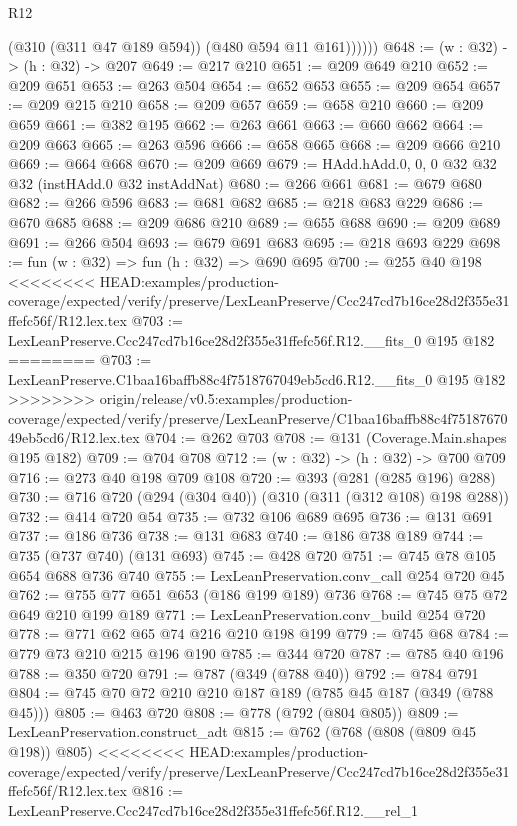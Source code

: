 \begin{lexlean}{R12}
\begin{coremodule}
{{{{{{{{              (@310 (@311 @47 @189 @594))
              (@480 @594 @11 @161))))))
@648 := (w : @32) -> (h : @32) -> @207
@649 := @217 @210
@651 := @209 @649 @210
@652 := @209 @651
@653 := @263 @504
@654 := @652 @653
@655 := @209 @654
@657 := @209 @215 @210
@658 := @209 @657
@659 := @658 @210
@660 := @209 @659
@661 := @382 @195
@662 := @263 @661
@663 := @660 @662
@664 := @209 @663
@665 := @263 @596
@666 := @658 @665
@668 := @209 @666 @210
@669 := @664 @668
@670 := @209 @669
@679 := HAdd.hAdd.{0, 0, 0} @32 @32 @32 (instHAdd.{0} @32 instAddNat)
@680 := @266 @661
@681 := @679 @680
@682 := @266 @596
@683 := @681 @682
@685 := @218 @683 @229
@686 := @670 @685
@688 := @209 @686 @210
@689 := @655 @688
@690 := @209 @689
@691 := @266 @504
@693 := @679 @691 @683
@695 := @218 @693 @229
@698 := fun (w : @32) => fun (h : @32) => @690 @695
@700 := @255 @40 @198
<<<<<<<< HEAD:examples/production-coverage/expected/verify/preserve/LexLeanPreserve/Ccc247cd7b16ce28d2f355e31ffefc56f/R12.lex.tex
@703 := LexLeanPreserve.Ccc247cd7b16ce28d2f355e31ffefc56f.R12.__fits_0 @195 @182
========
@703 := LexLeanPreserve.C1baa16baffb88c4f7518767049eb5cd6.R12.__fits_0 @195 @182
>>>>>>>> origin/release/v0.5:examples/production-coverage/expected/verify/preserve/LexLeanPreserve/C1baa16baffb88c4f7518767049eb5cd6/R12.lex.tex
@704 := @262 @703
@708 := @131 (Coverage.Main.shapes @195 @182)
@709 := @704 @708
@712 := (w : @32) -> (h : @32) -> @700 @709
@716 := @273 @40 @198 @709 @108
@720 := @393 (@281 (@285 @196) @288)
@730 := @716 @720 (@294 (@304 @40)) (@310 (@311 (@312 @108) @198 @288))
@732 := @414 @720 @54
@735 := @732 @106 @689 @695
@736 := @131 @691
@737 := @186 @736
@738 := @131 @683
@740 := @186 @738 @189
@744 := @735 (@737 @740) (@131 @693)
@745 := @428 @720
@751 := @745 @78 @105 @654 @688 @736 @740
@755 := LexLeanPreservation.conv_call @254 @720 @45
@762 := @755 @77 @651 @653 (@186 @199 @189) @736
@768 := @745 @75 @72 @649 @210 @199 @189
@771 := LexLeanPreservation.conv_build @254 @720
@778 := @771 @62 @65 @74 @216 @210 @198 @199
@779 := @745 @68
@784 := @779 @73 @210 @215 @196 @190
@785 := @344 @720
@787 := @785 @40 @196
@788 := @350 @720
@791 := @787 (@349 (@788 @40))
@792 := @784 @791
@804 := @745 @70 @72 @210 @210 @187 @189 (@785 @45 @187 (@349 (@788 @45)))
@805 := @463 @720
@808 := @778 (@792 (@804 @805))
@809 := LexLeanPreservation.construct_adt
@815 := @762 (@768 (@808 (@809 @45 @198)) @805)
<<<<<<<< HEAD:examples/production-coverage/expected/verify/preserve/LexLeanPreserve/Ccc247cd7b16ce28d2f355e31ffefc56f/R12.lex.tex
@816 := LexLeanPreserve.Ccc247cd7b16ce28d2f355e31ffefc56f.R12.__rel_1
}}}}}}}}
\end{coremodule}
\end{lexlean}

